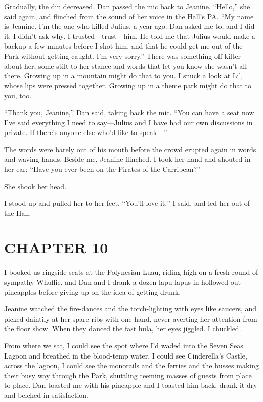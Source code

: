 Gradually, the din decreased. Dan passed the mic back to Jeanine.
“Hello,” she said again, and flinched from the sound of her voice
in the Hall's PA. “My name is Jeanine. I'm the one who killed
Julius, a year ago. Dan asked me to, and I did it. I didn't ask
why. I trusted—trust—him. He told me that Julius would make a
backup a few minutes before I shot him, and that he could get me
out of the Park without getting caught. I'm very sorry.” There was
something off-kilter about her, some stilt to her stance and words
that let you know she wasn't all there. Growing up in a mountain
might do that to you. I snuck a look at Lil, whose lips were
pressed together. Growing up in a theme park might do that to you,
too.

“Thank you, Jeanine,” Dan said, taking back the mic. “You can have
a seat now. I've said everything I need to say—Julius and I have
had our own discussions in private. If there's anyone else who'd
like to speak—”

The words were barely out of his mouth before the crowd erupted
again in words and waving hands. Beside me, Jeanine flinched. I
took her hand and shouted in her ear: “Have you ever been on the
Pirates of the Carribean?”

She shook her head.

I stood up and pulled her to her feet. “You'll love it,” I said,
and led her out of the Hall.

\section{CHAPTER 10}

I booked us ringside seats at the Polynesian Luau, riding high on a
fresh round of sympathy Whuffie, and Dan and I drank a dozen
lapu-lapus in hollowed-out pineapples before giving up on the idea
of getting drunk.

Jeanine watched the fire-dances and the torch-lighting with eyes
like saucers, and picked daintily at her spare ribs with one hand,
never averting her attention from the floor show. When they danced
the fast hula, her eyes jiggled. I chuckled.

From where we sat, I could see the spot where I'd waded into the
Seven Seas Lagoon and breathed in the blood-temp water, I could see
Cinderella's Castle, across the lagoon, I could see the monorails
and the ferries and the busses making their busy way through the
Park, shuttling teeming masses of guests from place to place. Dan
toasted me with his pineapple and I toasted him back, drank it dry
and belched in satisfaction.

